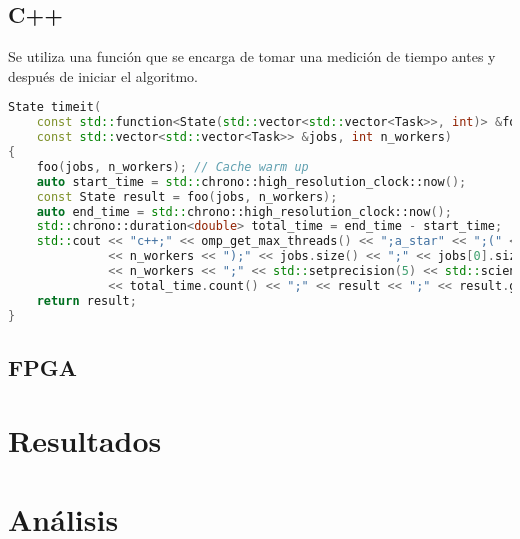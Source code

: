 \subsection{C++}

Se utiliza una función que se encarga de tomar una medición de tiempo
antes y después de iniciar el algoritmo.

\begin{lstlisting}[language=C++]
State timeit(
    const std::function<State(std::vector<std::vector<Task>>, int)> &foo,
    const std::vector<std::vector<Task>> &jobs, int n_workers)
{
    foo(jobs, n_workers); // Cache warm up
    auto start_time = std::chrono::high_resolution_clock::now();
    const State result = foo(jobs, n_workers);
    auto end_time = std::chrono::high_resolution_clock::now();
    std::chrono::duration<double> total_time = end_time - start_time;
    std::cout << "c++;" << omp_get_max_threads() << ";a_star" << ";(" << jobs << ", "
              << n_workers << ");" << jobs.size() << ";" << jobs[0].size() << ";"
              << n_workers << ";" << std::setprecision(5) << std::scientific
              << total_time.count() << ";" << result << ";" << result.get_max_worker_status() << std::endl;
    return result;
}
\end{lstlisting}

\subsection{FPGA}

\section{Resultados}

\section{Análisis}
